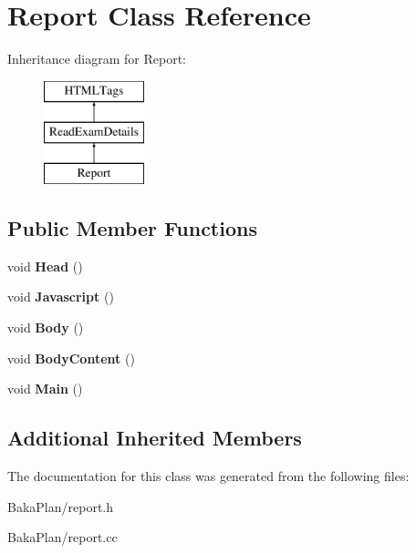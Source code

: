 \hypertarget{classReport}{\section{Report Class Reference}
\label{classReport}
}
Inheritance diagram for Report\-:\begin{figure}[H]
\begin{center}
\leavevmode
\includegraphics[height=3.000000cm]{classReport}
\end{center}
\end{figure}
\subsection*{Public Member Functions}
\begin{DoxyCompactItemize}
\item 
\hypertarget{classReport_a6b5a749dcbc19cb71503c5a6e2d465d3}{void {\bfseries Head} ()}\label{classReport_a6b5a749dcbc19cb71503c5a6e2d465d3}

\item 
\hypertarget{classReport_a97998b106d6fb7d6ccfea849892d21ee}{void {\bfseries Javascript} ()}\label{classReport_a97998b106d6fb7d6ccfea849892d21ee}

\item 
\hypertarget{classReport_a28dfc98e680194276c2bbb2fa4decf86}{void {\bfseries Body} ()}\label{classReport_a28dfc98e680194276c2bbb2fa4decf86}

\item 
\hypertarget{classReport_abfacfc97c910b8c2bc1a1102cc623d80}{void {\bfseries Body\-Content} ()}\label{classReport_abfacfc97c910b8c2bc1a1102cc623d80}

\item 
\hypertarget{classReport_a35895231f3a27c3247f9498cda2b42fe}{void {\bfseries Main} ()}\label{classReport_a35895231f3a27c3247f9498cda2b42fe}

\end{DoxyCompactItemize}
\subsection*{Additional Inherited Members}


The documentation for this class was generated from the following files\-:\begin{DoxyCompactItemize}
\item 
Baka\-Plan/report.\-h\item 
Baka\-Plan/report.\-cc\end{DoxyCompactItemize}
